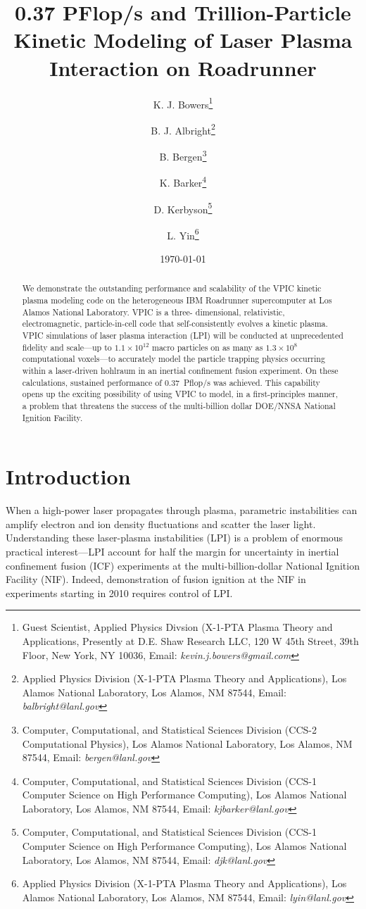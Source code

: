 \documentclass[10pt]{article}
\title{0.37 PFlop/s and Trillion-Particle Kinetic Modeling of Laser Plasma Interaction on Roadrunner}
\author{%
K. J. Bowers\thanks{Guest Scientist, Applied Physics Divsion (X-1-PTA Plasma Theory and Applications, Presently at D.E. Shaw Research LLC, 120 W 45th Street, 39th Floor, New York, NY 10036, Email: \emph{kevin.j.bowers@gmail.com}} \and%
%
B. J. Albright\thanks{Applied Physics Division (X-1-PTA Plasma Theory and Applications), Los Alamos National Laboratory, Los Alamos, NM 87544, Email: \emph{balbright@lanl.gov}} \and%
%
B. Bergen\thanks{Computer, Computational, and Statistical Sciences Division (CCS-2 Computational Physics), Los Alamos National Laboratory, Los Alamos, NM 87544, Email: \emph{bergen@lanl.gov}} \and%
%
K. Barker\thanks{Computer, Computational, and Statistical Sciences Division (CCS-1 Computer Science on High Performance Computing), Los Alamos National Laboratory, Los Alamos, NM 87544, Email: \emph{kjbarker@lanl.gov}} \and%
%
D. Kerbyson\thanks{Computer, Computational, and Statistical Sciences Division (CCS-1 Computer Science on High Performance Computing), Los Alamos National Laboratory, Los Alamos, NM 87544, Email: \emph{djk@lanl.gov}} \and%
%
L. Yin\thanks{Applied Physics Division (X-1-PTA Plasma Theory and Applications), Los Alamos National Laboratory, Los Alamos, NM 87544, Email: \emph{lyin@lanl.gov}}}
\date{\today}
\begin{document}
\maketitle
\thispagestyle{empty}

\begin{singlespace}
\begin{abstract}
We demonstrate the outstanding performance and scalability of the VPIC 
kinetic plasma modeling code on the heterogeneous IBM Roadrunner 
supercomputer at Los Alamos National Laboratory.  VPIC is a three-
dimensional, relativistic, electromagnetic, particle-in-cell code that 
self-consistently evolves a kinetic plasma.  VPIC simulations of laser 
plasma interaction (LPI) will be conducted at unprecedented fidelity 
and scale---up to $1.1 \times 10^{12}$ macro particles on as many as 
$1.3 \times 10^8$ 
computational voxels---to accurately model the particle trapping physics 
occurring within a laser-driven hohlraum in an inertial confinement 
fusion experiment.  On these calculations, sustained performance of 
0.37~Pflop/s was 
achieved.  This capability opens up the exciting possibility of using 
VPIC to model, in a first-principles manner, a problem that threatens 
the success of the multi-billion dollar DOE/NNSA National Ignition Facility.  
\end{abstract}
\end{singlespace}

\pagebreak

\section*{Introduction}

When a high-power laser propagates through plasma,
parametric instabilities can amplify electron and ion density fluctuations
and scatter the laser light.  Understanding these laser-plasma instabilities (LPI) 
is a problem of enormous practical interest---LPI account for half 
the margin for uncertainty in inertial confinement fusion (ICF) experiments 
at the multi-billion-dollar National Ignition Facility (NIF).  Indeed, 
demonstration of fusion ignition at the NIF in experiments starting in 
2010 requires control of LPI.  
\end{document}
